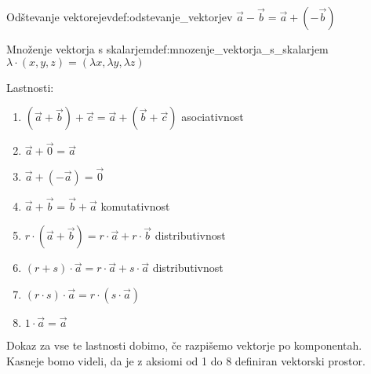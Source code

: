 \documentclass[a4,12pt]{article}
\begin{document}
    \begin{definition}{Odštevanje vektorejev}{def:odstevanje_vektorjev}
        \(\vec{a} - \vec{b} = \vec{a} + \left(-\vec{b}\right)\)
        \begin{figure}[H]
        \end{figure}
    \end{definition}
    \begin{definition}{Množenje vektorja s skalarjem}{def:mnozenje_vektorja_s_skalarjem}
        \(\lambda \cdot \left(x, y, z\right) = \left(\lambda x, \lambda y, \lambda z\right)\)
        \begin{figure}[H]
        \end{figure}
    \end{definition}

    \noindent Lastnosti:
    \begin{enumerate}
        \item \(\left(\vec{a} + \vec{b}\right) + \vec{c} = \vec{a} + \left(\vec{b} + \vec{c}\right)\) asociativnost
        \item \(\vec{a} + \vec{0} = \vec{a}\)
        \item \(\vec{a} + \left(- \vec{a}\right) = \vec{0}\)
        \item \(\vec{a} + \vec{b} = \vec{b} + \vec{a}\) komutativnost
        \item \(r \cdot \left(\vec{a} + \vec{b}\right) = r \cdot \vec{a} + r \cdot \vec{b}\) distributivnost
        \item \(\left(r + s\right) \cdot \vec{a} = r \cdot \vec{a} + s \cdot \vec{a}\) distributivnost
        \item \(\left(r \cdot s\right) \cdot \vec{a} = r \cdot \left(s \cdot \vec{a}\right)\)
        \item \(1 \cdot \vec{a} = \vec{a}\)
    \end{enumerate}
    Dokaz za vse te lastnosti dobimo, če razpišemo vektorje po komponentah. Kasneje bomo videli,
    da je z aksiomi od 1 do 8 definiran vektorski prostor.
\end{document}
